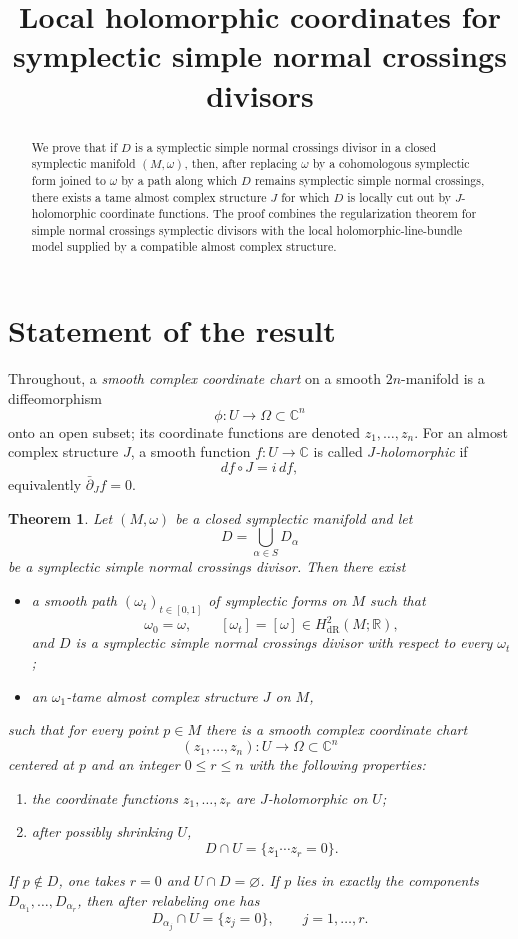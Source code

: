 \documentclass[11pt]{article}
\title{Local holomorphic coordinates for symplectic simple normal crossings divisors}
\author{}
\date{}
\newtheorem{theorem}{Theorem}
\theoremstyle{definition}
\begin{document}
\maketitle

\begin{abstract}
We prove that if \(D\) is a symplectic simple normal crossings divisor in a closed symplectic manifold \((M,\omega)\), then, after replacing \(\omega\) by a cohomologous symplectic form joined to \(\omega\) by a path along which \(D\) remains symplectic simple normal crossings, there exists a tame almost complex structure \(J\) for which \(D\) is locally cut out by \(J\)-holomorphic coordinate functions.  The proof combines the regularization theorem for simple normal crossings symplectic divisors with the local holomorphic-line-bundle model supplied by a compatible almost complex structure.
\end{abstract}

\section{Statement of the result}

Throughout, a \emph{smooth complex coordinate chart} on a smooth \(2n\)-manifold is a diffeomorphism
\[
\phi:U\longrightarrow \Omega\subset \mathbb C^n
\]
onto an open subset; its coordinate functions are denoted \(z_1,\dots,z_n\).  For an almost complex structure \(J\), a smooth function \(f:U\to \mathbb C\) is called \emph{\(J\)-holomorphic} if
\[
df\circ J=i\,df,
\]
equivalently \(\bar\partial_J f=0\).

\begin{theorem}\label{thm:main}
Let \((M,\omega)\) be a closed symplectic manifold and let
\[
D=\bigcup_{\alpha\in S}D_\alpha
\]
be a symplectic simple normal crossings divisor.  Then there exist
\begin{itemize}
\item a smooth path \((\omega_t)_{t\in[0,1]}\) of symplectic forms on \(M\) such that
\[
\omega_0=\omega,\qquad [\omega_t]=[\omega]\in H^2_{\mathrm{dR}}(M;\mathbb R),
\]
and \(D\) is a symplectic simple normal crossings divisor with respect to every \(\omega_t\);
\item an \(\omega_1\)-tame almost complex structure \(J\) on \(M\),
\end{itemize}
such that for every point \(p\in M\) there is a smooth complex coordinate chart
\[
(z_1,\dots,z_n):U\longrightarrow \Omega\subset \mathbb C^n
\]
centered at \(p\) and an integer \(0\le r\le n\) with the following properties:
\begin{enumerate}
\item the coordinate functions \(z_1,\dots,z_r\) are \(J\)-holomorphic on \(U\);
\item after possibly shrinking \(U\),
\[
D\cap U=\{z_1\cdots z_r=0\}.
\]
\end{enumerate}
If \(p\notin D\), one takes \(r=0\) and \(U\cap D=\varnothing\).  If \(p\) lies in exactly the components \(D_{\alpha_1},\dots,D_{\alpha_r}\), then after relabeling one has
\[
D_{\alpha_j}\cap U=\{z_j=0\},\qquad j=1,\dots,r.
\]
\end{theorem}
\end{document}
